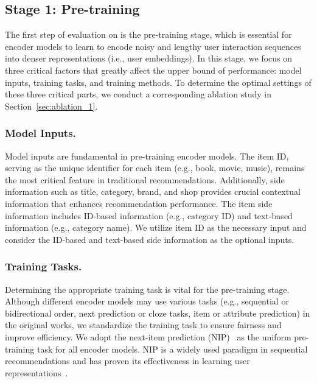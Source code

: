 \subsection{Stage 1: Pre-training}
The first step of evaluation on \name is the pre-training stage, which is essential for encoder models to learn to encode noisy and lengthy user interaction sequences into denser representations (i.e., user embeddings). In this stage, we focus on three critical factors that greatly affect the upper bound of performance: model inputs, training tasks, and training methods. To determine the optimal settings of these three critical parts, we conduct a corresponding ablation study in Section~\ref{sec:ablation_1}.

\subsubsection{\textbf{Model Inputs.}}
Model inputs are fundamental in pre-training encoder models. The item ID, serving as the unique identifier for each item (e.g., book, movie, music), remains the most critical feature in traditional recommendations. Additionally, side information such as title, category, brand, and shop provides crucial contextual information that enhances recommendation performance. The item side information includes ID-based information (e.g., category ID) and text-based information (e.g., category name). 
We utilize item ID as the necessary input and consider the ID-based and text-based side information as the optional inputs. 

\subsubsection{\textbf{Training Tasks.}}
Determining the appropriate training task is vital for the pre-training stage. Although different encoder models may use various tasks (e.g., sequential or bidirectional order, next prediction or cloze tasks, item or attribute prediction) in the original works, we standardize the training task to ensure fairness and improve efficiency. We adopt the next-item prediction (NIP)~\cite{hidasi2015session,kang2018self} as the uniform pre-training task for all encoder models. NIP is a widely used paradigm in sequential recommendations and has proven its effectiveness in learning user representations~\cite{fang2020deep}.

